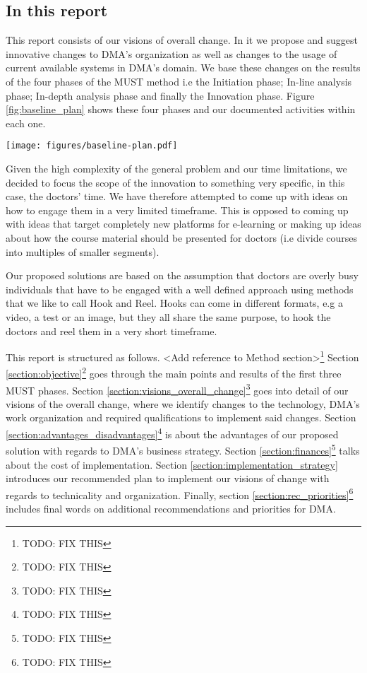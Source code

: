 \subsection{In this report}
This report consists of our visions of overall change. In it we propose and suggest innovative changes to DMA’s organization as well as changes to the usage of current available systems in DMA’s domain. We base these changes on the results of the four phases of the MUST method \cite{bodker} i.e the Initiation phase; In-line analysis phase; In-depth analysis phase and finally the Innovation phase. Figure \ref{fig:baseline_plan} shows these four phases and our documented activities within each one.

\begin{figure*}[h!]
 \begin{center}
  \texttt{[image: figures/baseline-plan.pdf]}
  \caption{Our baseline-plan for the project.\label{fig:baseline_plan}}
 \end{center}
\end{figure*}



Given the high complexity of the general problem and our time limitations, we decided to focus the scope of the innovation to something very specific, in this case, the doctors’ time. We have therefore attempted to come up with ideas on how to engage them in a very limited timeframe. This is opposed to coming up with ideas that target completely new platforms for e-learning or making up ideas about how the course material should be presented for doctors (i.e divide courses into multiples of smaller segments).

Our proposed solutions are based on the assumption that doctors are overly busy individuals that have to be engaged with a well defined approach using methods that we like to call Hook and Reel. Hooks can come in different formats, e.g a video, a test or an image, but they all share the same purpose, to hook the doctors and reel them in a very short timeframe.

This report is structured as follows. <Add reference to Method section>\footnote{TODO: FIX THIS} Section \ref{section:objective}\footnote{TODO: FIX THIS} goes through the main points and results of the first three MUST phases. Section \ref{section:visions_overall_change}\footnote{TODO: FIX THIS} goes into detail of our visions of the overall change, where we identify changes to the technology, DMA’s work organization and required qualifications to implement said changes. Section \ref{section:advantages_disadvantages}\footnote{TODO: FIX THIS} is about the advantages of our proposed solution with regards to DMA’s business strategy. Section \ref{section:finances}\footnote{TODO: FIX THIS} talks about the cost of implementation. Section \ref{section:implementation_strategy} introduces our recommended plan to implement our visions of change with regards to technicality and organization. Finally, section \ref{section:rec_priorities}\footnote{TODO: FIX THIS} includes final words on additional recommendations and priorities for DMA.

